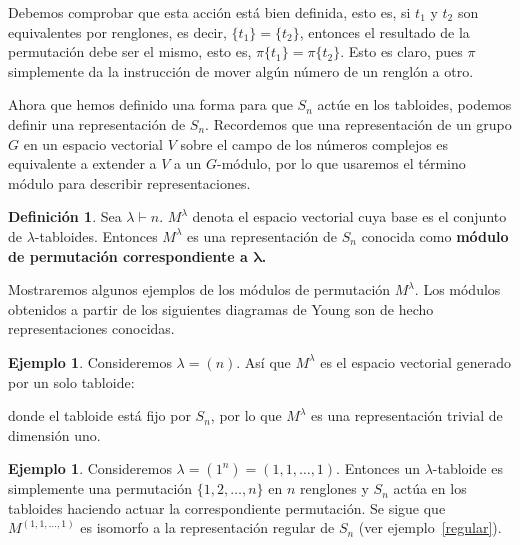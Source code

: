 \documentclass[12pt]{book}
\theoremstyle{definition}
\newtheorem{definition}[theorem]{Definición}
\newtheorem{example}[theorem]{Ejemplo}
\newcounter{in}
\newcounter{ini}
\begin{document}
Debemos comprobar que esta acción está bien definida, esto es, si $t_{1}$
y $t_{2}$ son equivalentes por renglones, es decir,
$\{t_{1}\}=\{t_{2}\}$, entonces el resultado de la permutación debe
ser el mismo, esto es, $\pi\{t_{1}\}=\pi\{t_{2}\}$. Esto es claro,
pues $\pi$ simplemente da la instrucción de mover algún número de un
renglón a otro.

Ahora que hemos definido una forma para que $S_{n}$ actúe en los tabloides,
podemos definir una representación de $S_{n}$. Recordemos que una
representación de un grupo $G$ en un espacio vectorial $V$ sobre el
campo de los números complejos es equivalente a extender a $V$ a un $G$-módulo,
por lo que usaremos el término módulo para describir representaciones.

\begin{definition}
  Sea $\lambda\vdash n$. $M^{\lambda}$ denota el espacio vectorial
  cuya base es el conjunto de $\lambda$-tabloides. Entonces
  $M^{\lambda}$ es una representación de $S_{n}$ conocida como \textbf{módulo
  de permutación correspondiente a $\boldsymbol{\lambda}$.}
\end{definition}

Mostraremos algunos ejemplos de los módulos de
permutación $M^{\lambda}$. Los módulos obtenidos a partir de los siguientes diagramas de
Young son de hecho representaciones conocidas.

\begin{center}
   \qquad
  \qquad
\end{center}

\begin{example}
  Consideremos $\lambda=(n)$. Así que $M^{\lambda}$ es el espacio
  vectorial generado por un solo tabloide:
  \begin{center}
  \end{center}
donde el tabloide está fijo por $S_{n}$, por lo que $M^{\lambda}$ es
una representación trivial de dimensión uno.
\end{example}

\begin{example}
  Consideremos $\lambda=(1^{n})=(1,1,\ldots,1)$. Entonces un $\lambda$-tabloide es
  simplemente una permutación $\{1,2,\ldots,n\}$ en $n$ renglones y $S_{n}$ actúa en los
  tabloides haciendo actuar la correspondiente permutación. Se sigue que $M^{(1,1,\ldots,1)}$ es
  isomorfo a la representación regular de $S_{n}$ (ver ejemplo~\ref{regular}).
\end{example}
\end{document}
